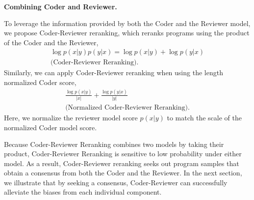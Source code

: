 \documentclass[nohyperref]{article}
\theoremstyle{plain}
\theoremstyle{definition}
\theoremstyle{remark}
\renewcommand{\paragraph}[1]{
     \textbf{#1} 
 }
\begin{document}
\paragraph{Combining Coder and Reviewer.}
To leverage the information provided by both the Coder and the Reviewer model, we propose Coder-Reviewer reranking, which reranks programs using the product of the Coder and the Reviewer, 
\begin{multline*}
\log p(x|y)p(y|x) =
\log p(x|y) + \log p(y|x) \\ \text{(Coder-Reviewer Reranking}).
\end{multline*}
Similarly, we can apply Coder-Reviewer reranking when using the length normalized Coder score,
\begin{multline*}
\frac{\log p(x|y)}{\lvert x \rvert} + \frac{\log p(y|x)}{\lvert y \rvert} \\ \text{(Normalized Coder-Reviewer Reranking}).
\end{multline*}
Here, we normalize the reviewer model score $p(x|y)$ to match the scale of the normalized Coder model score.

Because Coder-Reviewer Reranking combines two models by taking their product, Coder-Reviewer Reranking is sensitive to low probability under either model.
As a result, Coder-Reviewer reranking seeks out program samples that obtain a consensus from both the Coder and the Reviewer.
In the next section, we illustrate that by seeking a consensus, Coder-Reviewer can successfully alleviate the biases from each individual component.
\end{document}

